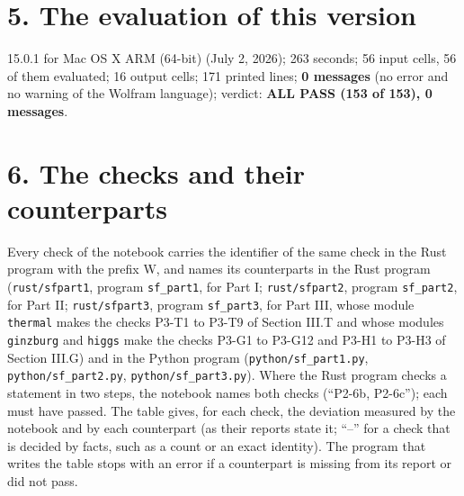 \documentclass[
  10pt,
]{article}
\begin{document}
\hypertarget{the-evaluation-of-this-version}{%
\section{5. The evaluation of this
version}\label{the-evaluation-of-this-version}}

15.0.1 for Mac OS X ARM (64-bit) (July 2, 2026); 263 seconds; 56 input
cells, 56 of them evaluated; 16 output cells; 171 printed lines;
\textbf{0 messages} (no error and no warning of the Wolfram language);
verdict: \textbf{ALL PASS (153 of 153), 0 messages}.

\hypertarget{the-checks-and-their-counterparts}{%
\section{6. The checks and their
counterparts}\label{the-checks-and-their-counterparts}}

Every check of the notebook carries the identifier of the same check in
the Rust program with the prefix W, and names its counterparts in the
Rust program (\texttt{rust/sfpart1}, program \texttt{sf\_part1}, for
Part I; \texttt{rust/sfpart2}, program \texttt{sf\_part2}, for Part II;
\texttt{rust/sfpart3}, program \texttt{sf\_part3}, for Part III, whose
module \texttt{thermal} makes the checks P3-T1 to P3-T9 of Section III.T
and whose modules \texttt{ginzburg} and \texttt{higgs} make the checks
P3-G1 to P3-G12 and P3-H1 to P3-H3 of Section III.G) and in the Python
program (\texttt{python/sf\_part1.py}, \texttt{python/sf\_part2.py},
\texttt{python/sf\_part3.py}). Where the Rust program checks a statement
in two steps, the notebook names both checks (``P2-6b, P2-6c''); each
must have passed. The table gives, for each check, the deviation
measured by the notebook and by each counterpart (as their reports state
it; ``--'' for a check that is decided by facts, such as a count or an
exact identity). The program that writes the table stops with an error
if a counterpart is missing from its report or did not pass.
\end{document}
